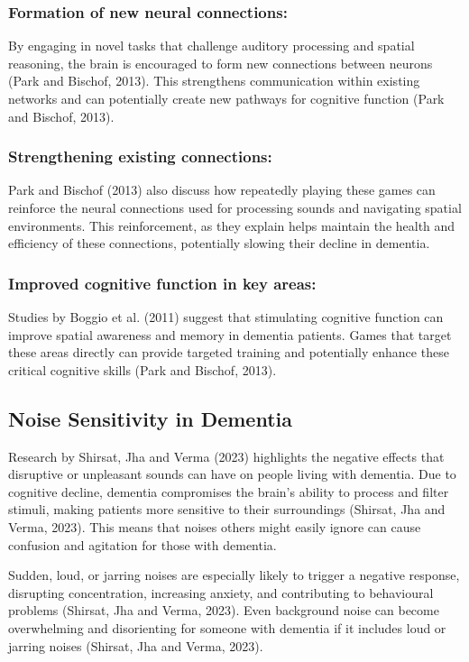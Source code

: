 \documentclass{l4proj}
\begin{document}
\subsubsection{Formation of new neural connections:} By engaging in novel tasks that challenge auditory processing and spatial reasoning, the brain is encouraged to form new connections between neurons (Park and Bischof, 2013). This strengthens communication within existing networks and can potentially create new pathways for cognitive function (Park and Bischof, 2013).

\subsubsection{Strengthening existing connections:} Park and Bischof (2013) also discuss how repeatedly playing these games can reinforce the neural connections used for processing sounds and navigating spatial environments. This reinforcement, as they explain helps maintain the health and efficiency of these connections, potentially slowing their decline in dementia.

\subsubsection{Improved cognitive function in key areas:} Studies by Boggio et al. (2011) suggest that stimulating cognitive function can improve spatial awareness and memory in dementia patients. Games that target these areas directly can provide targeted training and potentially enhance these critical cognitive skills (Park and Bischof, 2013).

\subsection{Noise Sensitivity in Dementia}\label{sec:noise_sensitivity}
Research by Shirsat, Jha and Verma (2023) highlights the negative effects that disruptive or unpleasant sounds can have on people living with dementia. Due to cognitive decline, dementia compromises the brain's ability to process and filter stimuli, making patients more sensitive to their surroundings (Shirsat, Jha and Verma, 2023). This means that noises others might easily ignore can cause confusion and agitation for those with dementia.

Sudden, loud, or jarring noises are especially likely to trigger a negative response, disrupting concentration, increasing anxiety, and contributing to behavioural problems (Shirsat, Jha and Verma, 2023). Even background noise can become overwhelming and disorienting for someone with dementia if it includes loud or jarring noises (Shirsat, Jha and Verma, 2023).
\end{document}
